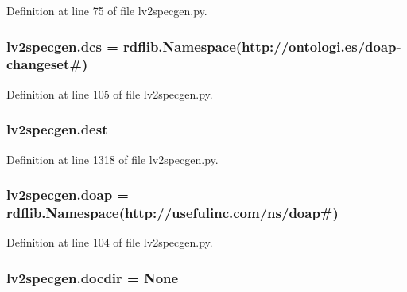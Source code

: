 Definition at line 75 of file lv2specgen.\+py.

\subsubsection[{\texorpdfstring{dcs}{dcs}}]{\setlength{\rightskip}{0pt plus 5cm}lv2specgen.\+dcs = rdflib.\+Namespace(\textquotesingle{}http\+://ontologi.\+es/{\bf doap}-\/changeset\#\textquotesingle{})}\hypertarget{namespacelv2specgen_a731399ef9a73cb8a99da5833de959594}{}\label{namespacelv2specgen_a731399ef9a73cb8a99da5833de959594}


Definition at line 105 of file lv2specgen.\+py.

\subsubsection[{\texorpdfstring{dest}{dest}}]{\setlength{\rightskip}{0pt plus 5cm}lv2specgen.\+dest}\hypertarget{namespacelv2specgen_af69976955f051ccef12ad2f85392e818}{}\label{namespacelv2specgen_af69976955f051ccef12ad2f85392e818}


Definition at line 1318 of file lv2specgen.\+py.

\subsubsection[{\texorpdfstring{doap}{doap}}]{\setlength{\rightskip}{0pt plus 5cm}lv2specgen.\+doap = rdflib.\+Namespace(\textquotesingle{}http\+://usefulinc.\+com/{\bf ns}/doap\#\textquotesingle{})}\hypertarget{namespacelv2specgen_a1dfdd8c7e93b078e9798d1d1074d85e0}{}\label{namespacelv2specgen_a1dfdd8c7e93b078e9798d1d1074d85e0}


Definition at line 104 of file lv2specgen.\+py.

\subsubsection[{\texorpdfstring{docdir}{docdir}}]{\setlength{\rightskip}{0pt plus 5cm}lv2specgen.\+docdir = None}\hypertarget{namespacelv2specgen_a00e6923126250f5f2581f2e5776009de}{}\label{namespacelv2specgen_a00e6923126250f5f2581f2e5776009de}


